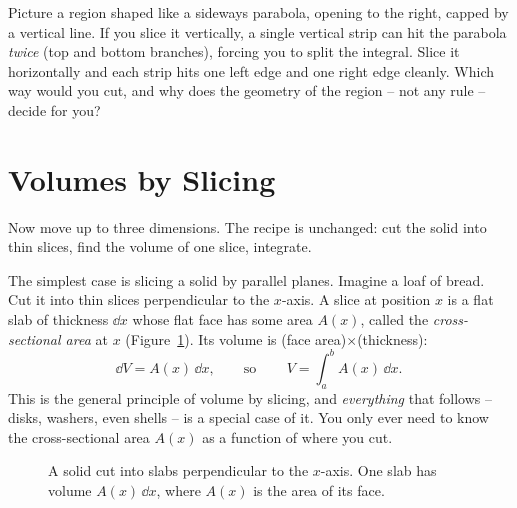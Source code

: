 \begin{walkbox}
Picture a region shaped like a sideways parabola, opening to the right, capped by
a vertical line. If you slice it vertically, a single vertical strip can hit the
parabola \emph{twice} (top and bottom branches), forcing you to split the
integral. Slice it horizontally and each strip hits one left edge and one right
edge cleanly. Which way would you cut, and why does the geometry of the region --
not any rule -- decide for you?
\end{walkbox}

\section{Volumes by Slicing}
\label{ch26:slicing}

Now move up to three dimensions. The recipe is unchanged: cut
the solid into thin slices, find the volume of one slice, integrate.

The simplest case is slicing a solid by parallel planes. Imagine a loaf of bread.
Cut it into thin slices perpendicular to the $x$-axis. A slice at position $x$ is
a flat slab of thickness $\dd x$ whose flat face has some area $A(x)$, called the
\emph{cross-sectional area} at $x$ (Figure~\ref{ch26:fig-slicing}). Its volume
is (face area)$\times$(thickness):
\[
  \dd V = A(x)\,\dd x, \qquad\text{so}\qquad
  \boxed{\,V = \int_a^b A(x)\,\dd x.\,}
\]
This is the general principle of volume by slicing, and \emph{everything} that
follows -- disks, washers, even shells -- is a special case of it. You only ever
need to know the cross-sectional area $A(x)$ as a function of where you cut.

\begin{figure}[H]
\centering
{}
\caption{A solid cut into slabs perpendicular to the $x$-axis. One slab has
volume $A(x)\,\dd x$, where $A(x)$ is the area of its face.}
\label{ch26:fig-slicing}
\end{figure}

